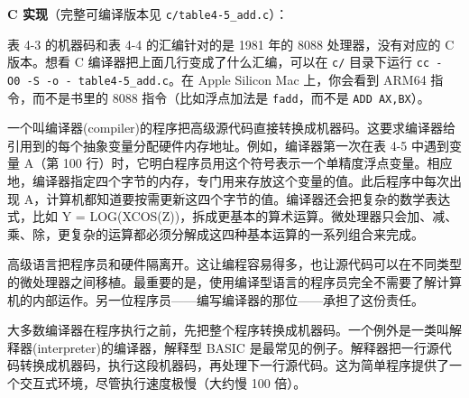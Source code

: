 \textbf{C 实现}（完整可编译版本见 \texttt{c/table4-5\_add.c}）：

\begin{Shaded}
\begin{Highlighting}[]

\OperatorTok{(}\OperatorTok{)}
\OperatorTok{\{}
    \OperatorTok{=} \OperatorTok{;}                 
    \OperatorTok{=} \OperatorTok{;}                 
    \OperatorTok{=}\OperatorTok{+}\OperatorTok{;}                
\OperatorTok{(}\OperatorTok{,}\OperatorTok{);}
     \OperatorTok{;}
\OperatorTok{\}}
\end{Highlighting}
\end{Shaded}

表 4-3 的机器码和表 4-4 的汇编针对的是 1981 年的 8088 处理器，没有对应的
C 版本。想看 C 编译器把上面几行变成了什么汇编，可以在 \texttt{c/}
目录下运行 \texttt{cc\ -O0\ -S\ -o\ -\ table4-5\_add.c}。在 Apple
Silicon Mac 上，你会看到 ARM64 指令，而不是书里的 8088
指令（比如浮点加法是 \texttt{fadd}，而不是 \texttt{ADD\ AX,BX}）。

一个叫编译器(compiler)的程序把高级源代码直接转换成机器码。这要求编译器给引用到的每个抽象变量分配硬件内存地址。例如，编译器第一次在表
4-5 中遇到变量 A（第 100
行）时，它明白程序员用这个符号表示一个单精度浮点变量。相应地，编译器指定四个字节的内存，专门用来存放这个变量的值。此后程序中每次出现
A，计算机都知道要按需更新这四个字节的值。编译器还会把复杂的数学表达式，比如
Y =
LOG(XCOS(Z))，拆成更基本的算术运算。微处理器只会加、减、乘、除，更复杂的运算都必须分解成这四种基本运算的一系列组合来完成。

高级语言把程序员和硬件隔离开。这让编程容易得多，也让源代码可以在不同类型的微处理器之间移植。最重要的是，使用编译型语言的程序员完全不需要了解计算机的内部运作。另一位程序员------编写编译器的那位------承担了这份责任。

大多数编译器在程序执行之前，先把整个程序转换成机器码。一个例外是一类叫解释器(interpreter)的编译器，解释型
BASIC
是最常见的例子。解释器把一行源代码转换成机器码，执行这段机器码，再处理下一行源代码。这为简单程序提供了一个交互式环境，尽管执行速度极慢（大约慢
100 倍）。

